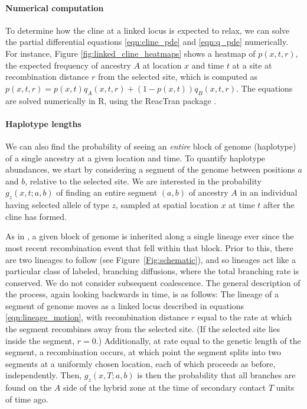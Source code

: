\documentclass[11pt,letterpaper]{article}
\begin{document}
\paragraph{Numerical computation}
To determine how the cline at a linked locus is expected to relax,
we can solve the partial differential equations \eqref{eqn:cline_pde} and \eqref{eqn:q_pde} numerically.
For instance, Figure \ref{fig:linked_cline_heatmaps} shows a heatmap of $p(x,t,r)$, 
the expected frequency of ancestry $A$ at location $x$ and time $t$ 
at a site at recombination distance $r$ from the selected site,
which is computed as $p(x,t,r) = p(x,t) q_A(x,t,r) + (1-p(x,t)) q_B(x,t,r)$. 
The equations are solved numerically in R, using the ReacTran package \citep{soetaert2012reactive}.

\paragraph{Haplotype lengths}
We can also find the probability of seeing an \emph{entire} block of genome (haplotype)
of a single ancestry at a given location and time.
To quantify haplotype abundances, we start by considering a segment of the genome between positions $a$ and $b$, relative to the selected site. 
We are interested in the probability $g_z(x,t;a,b)$ 
of finding an entire segment $(a,b)$ of ancestry $A$ in an individual having selected allele of type $z$,
sampled at spatial location $x$ at time $t$ after the cline has formed.

As in \citet{Sedghifar2015}, 
a given block of genome is inherited along a single lineage ever since the most recent recombination event
that fell within that block.
Prior to this, there are two lineages to follow (see Figure~\ref{Fig:schematic}),
and so lineages act like a particular class of labeled, branching diffusions,
where the total branching rate is conserved. 
We do not consider subsequent coalescence.
The general description of the process, again looking backwards in time, is as follows:
The lineage of a segment of genome moves as a linked locus described in equations \eqref{eqn:lineage_motion},
with recombination distance $r$ equal to the rate at which the segment recombines away from the selected site.
(If the selected site lies inside the segment, $r=0$.)
Additionally, at rate equal to the genetic length of the segment,
a recombination occurs, at which point the segment splits into two segments at a uniformly chosen location,
each of which proceeds as before, independently. 
Then, $g_z(x,T;a,b)$ is then the probability that all branches are found on the $A$ side of the hybrid zone
at the time of secondary contact $T$ units of time ago.
\end{document}
